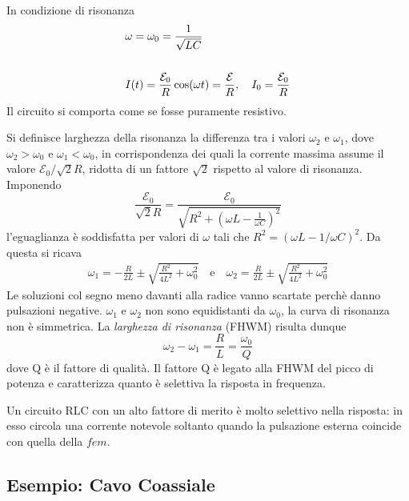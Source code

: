 In condizione di risonanza 
\begin{align}
	& \omega = \omega_0 = \frac{1}{\sqrt{LC}} \\ \rule{0pt}{30pt}
	& I(t) = \frac{\mathcal{E}_0}{R} \cos(\omega t) = \frac{\mathcal{E}}{R}, \quad I_0 = \frac{\mathcal{E}_0}{R}
\end{align}
Il circuito si comporta come se fosse puramente resistivo. 

Si definisce larghezza della risonanza la differenza tra i valori $\omega_2$ e $\omega_1$, dove $\omega_2 > \omega_0$ e $\omega_1 < \omega_0$, in corrispondenza dei quali la corrente massima assume il valore $\mathcal{E}_0 / \sqrt{2}R$, ridotta di un fattore $\sqrt{2}$ rispetto al valore di risonanza. Imponendo
\begin{equation*}
	\frac{\mathcal{E}_0}{\sqrt{2}R} = \frac{\mathcal{E}_0}{\sqrt{R^2 + \left(\omega L - \frac{1}{\omega C}\right)^2}}
\end{equation*}
l'eguaglianza \`e soddisfatta per valori di $\omega$ tali che $R^2 = (\omega L - 1/\omega C)^2$. Da questa si ricava
\begin{align*}
	\omega_1 = - \frac{R}{2L} \pm \sqrt{\frac{R^2}{4L^2} + \omega_0^2} \quad \text{e} \quad \omega_2 = \frac{R}{2L} \pm \sqrt{\frac{R^2}{4L^2}+\omega_0^2}
\end{align*}
Le soluzioni col segno meno davanti alla radice vanno scartate perch\`e danno pulsazioni negative. $\omega_1$ e $\omega_2$ non sono equidistanti da $\omega_0$, la curva di risonanza non \`e simmetrica. La \textit{larghezza di risonanza }(FHWM) risulta dunque 
\begin{equation}
	\omega_2 - \omega_1 = \frac{R}{L} = \frac{\omega_0}{Q}
\end{equation}
dove Q \`e il fattore di qualit\`a. Il fattore Q \`e legato alla FHWM del picco di potenza e caratterizza quanto \`e selettiva la risposta in frequenza. 

Un circuito RLC con un alto fattore di merito \`e molto selettivo nella risposta: in esso circola una corrente notevole soltanto quando la pulsazione esterna coincide con quella della $fem$. 

\subsection{Esempio: Cavo Coassiale}

